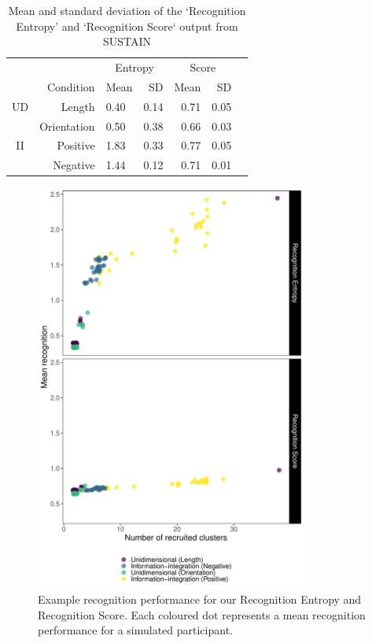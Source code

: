 \documentclass[12pt]{article}
\begin{document}
\begin{table}[ht]
    \centering
\caption{Mean and standard deviation of the `Recognition Entropy' 
         and `Recognition Score` output from SUSTAIN} 
\label{table:recognitionSUSTAIN}
    \begin{tabular}{crlrrrr}  
        \hline
        & & \multicolumn{2}{c}{Entropy} & \multicolumn{2}{c}{Score}\\
        & Condition & Mean & SD & Mean & SD\\ 
    \hline
        UD & Length & 0.40 & 0.14 & 0.71 & 0.05\\ 
           & Orientation & 0.50 & 0.38 & 0.66 & 0.03\\ 
        II & Positive & 1.83 & 0.33 & 0.77 & 0.05 \\ 
           & Negative & 1.44 & 0.12 & 0.71 & 0.01 \\
    \hline
    \end{tabular}
    \end{table}



\begin{figure}
	\centering
	\includegraphics[width=0.8\textwidth]{Images/pu037recognitionGraph}	
	\caption{Example recognition performance for our Recognition Entropy
    and Recognition Score. Each coloured dot represents 
    a mean recognition performance for a simulated participant.}
    \label{fig:SUSTAINrecognition}
\end{figure}
\end{document}
